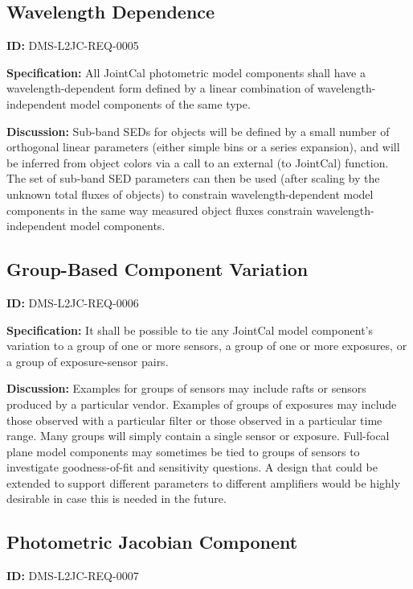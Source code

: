 \documentclass[SE,toc,lsstdraft]{lsstdoc}
\begin{document}
\subsection{Wavelength Dependence}

\label{DMS-L2JC-REQ-0005}
\textbf{ID:} DMS-L2JC-REQ-0005

\textbf{Specification:}
All JointCal photometric model components shall have a wavelength-dependent form defined by a linear combination of wavelength-independent model components of the same type.

\textbf{Discussion:}
Sub-band SEDs for objects will be defined by a small number of orthogonal linear parameters (either simple bins or a series expansion), and will be inferred from object colors via a call to an external (to JointCal) function.  The set of sub-band SED parameters can then be used (after scaling by the unknown total fluxes of objects) to constrain wavelength-dependent model components in the same way measured object fluxes constrain wavelength-independent model components.

\subsection{Group-Based Component Variation}

\label{DMS-L2JC-REQ-0006}
\textbf{ID:} DMS-L2JC-REQ-0006

\textbf{Specification:}
It shall be possible to tie any JointCal model component's variation to a group of one or more sensors, a group of one or more exposures, or a group of exposure-sensor pairs.

\textbf{Discussion:}
Examples for groups of sensors may include rafts or sensors produced by a particular vendor.  Examples of groups of exposures may include those observed with a particular filter or those observed in a particular time range.  Many groups will simply contain a single sensor or exposure.  Full-focal plane model components may sometimes be tied to groups of sensors to investigate goodness-of-fit and sensitivity questions.  A design that could be extended to support different parameters to different amplifiers would be highly desirable in case this is needed in the future.

\subsection{Photometric Jacobian Component}

\label{DMS-L2JC-REQ-0007}
\textbf{ID:} DMS-L2JC-REQ-0007
\end{document}
